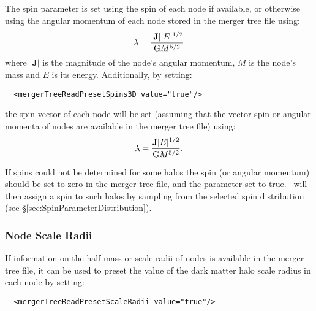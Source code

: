 The spin parameter is set using the spin of each node if available, or otherwise using the angular momentum of each node stored in the merger tree file using:
\begin{equation}
 \lambda = {|\mathbf{J}| |E|^{1/2} \over \mathrm{G} M^{5/2}}
\end{equation}
where $|\mathbf{J}|$ is the magnitude of the node's angular momentum, $M$ is the node's mass and $E$ is its energy. Additionally, by setting:

\begin{verbatim}
  <mergerTreeReadPresetSpins3D value="true"/>
\end{verbatim}
the spin vector of each node will be set (assuming that the vector spin or angular momenta of nodes are available in the merger tree file) using:
\begin{equation}
 \mathbf{\lambda} = {\mathbf{J} |E|^{1/2} \over \mathrm{G} M^{5/2}}.
\end{equation}

If spins could not be determined for some halos the spin (or angular momentum) should be set to zero in the merger tree file, and the parameter {\normalfont \ttfamily [mergerTreeReadPresetUnphysicalSpins]} set to {\normalfont \ttfamily true}. \glc\ will then assign a spin to such halos by sampling from the selected spin distribution (see \S\ref{sec:SpinParameterDistribution}). 

\subsubsection{Node Scale Radii}

If information on the half-mass or scale radii of nodes is available in the merger tree file, it can be used to preset the value of the dark matter halo scale radius in each node by setting:

\begin{verbatim}
  <mergerTreeReadPresetScaleRadii value="true"/>
\end{verbatim}

